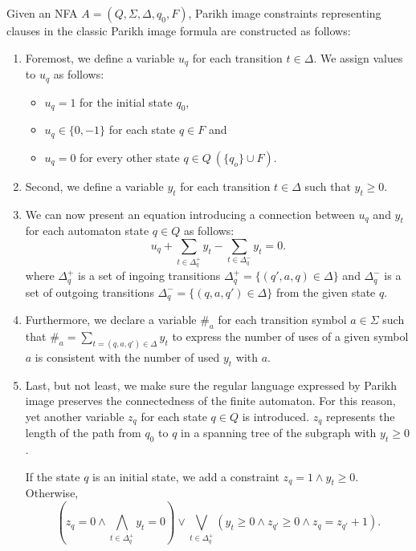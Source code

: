 Given an NFA $A = (Q, \Sigma, \Delta, q_0, F)$, Parikh image constraints representing clauses in the classic Parikh image formula are constructed as follows:
\begin{enumerate}
    \item \label{clauses:u_original} Foremost, we define a variable $u_{q}$ for each transition $t \in \Delta$. We assign values to $u_{q}$ as follows:
    \begin{itemize}
        \item $u_{q} = 1$ for the initial state $q_0$,
        \item $u_{q} \in \{ 0, -1 \}$ for each state $q \in F$ and
        \item $u_{q} = 0$ for every other state $q \in Q \ ( \{ q_{o} \} \cup F )$.
    \end{itemize}

    \item \label{clauses:y_original} Second, we define a variable $y_{t}$ for each transition $t \in \Delta$ such that $y_{t} \geq 0$.

    \item \label{clauses:uy_original} We can now present an equation introducing a connection between $u_{q}$ and $y_{t}$ for each automaton state $q \in Q$ as follows:
    $$ u_q + \sum_{t \in \Delta_q^+} y_t - \sum_{t \in \Delta_q^-} y_t = 0.$$
    where $\Delta_q^+$ is a set of ingoing transitions $ \Delta_q^+ = \{ (q',a,q) \in \Delta \}$ and $\Delta_q^-$ is a set of outgoing transitions $ \Delta_q^- = \{ (q,a,q') \in \Delta \} $ from the given state $q$.

    \item \label{clauses:hash_original} Furthermore, we declare a variable $\#_a$ for each transition symbol $ a \in \Sigma$ such that $\#_a = \sum_{t = (q, a, q') \in \Delta} y_t$ to express the number of uses of a given symbol $a$ is consistent with the number of used $y_t$ with $a$.

    \item \label{clauses:z_original} Last, but not least, we make sure the regular language expressed by Parikh image preserves the connectedness of the finite automaton. For this reason, yet another variable $z_q$ for each state $q \in Q$ is introduced. $z_q$ represents the length of the path from $q_0$ to $q$ in a spanning tree of the subgraph with $y_t \geq 0$.

    If the state $q$ is an initial state, we add a constraint $z_q = 1 \land y_t \geq 0$. Otherwise,
        $$(z_q = 0 \land \bigwedge_{t \in \Delta_q^+} y_t = 0) \lor \bigvee_{t \in \Delta_q^+} (y_t \geq 0 \land z_{q'} \geq 0 \land z_q = z_{q'} + 1) \text{.}$$
\end{enumerate}

